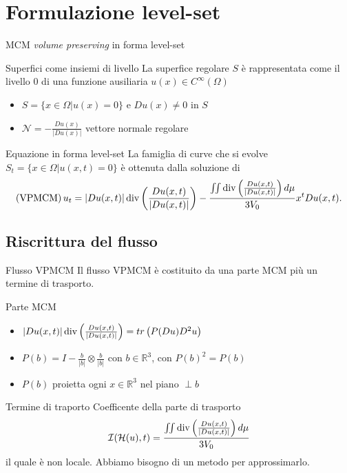 \section{Formulazione level-set}
\begin{frame}{MCM \emph{volume preserving} in forma level-set}
  \begin{block}{Superfici come insiemi di livello}
    La superfice regolare $S$ è rappresentata come il livello $0$ di
    una funzione ausiliaria $u(x)\in C^{\infty}(\Omega)$
    \begin{itemize}
      \item $S=\{x\in\Omega | u(x)=0\}$ e $Du(x)\neq 0$ in $S$
      \item $\mathcal{N}=-\frac{Du(x)}{|Du(x)|}$ vettore normale
        regolare
    \end{itemize}
  \end{block}
  \begin{block}{Equazione in forma level-set}
    La famiglia di curve che si evolve $S_t=\{x\in\Omega | u(x,t)=0\}$
    è ottenuta dalla soluzione di
    \[
      (\text{VPMCM})\,u_t=|Du(x,t)|\operatorname{div}\left(\frac{Du(x,t)}{|Du(x,t)|}\right)-\frac{\iint\operatorname{div}\left(\frac{Du(x,t)}{|Du(x,t)|}\right)d\mu}{3V_0}x^tDu(x,t). 
      \]
  \end{block}
\end{frame}
\subsection*{Riscrittura del flusso}
\begin{frame}{Flusso VPMCM}
  Il flusso VPMCM è costituito da una parte MCM più un termine di trasporto.
  \begin{block}{Parte MCM} 
    \begin{itemize}
    \item
      $|Du(x,t)|\operatorname{div}\left(\frac{Du(x,t)}{|Du(x,t)|}\right)=tr\left(P(Du)D^2u\right)$
    \item $P(b)=I-\frac{b}{|b|}\otimes\frac{b}{|b|}$ con
      $b\in\mathbb{R}^3$, con $P(b)^2=P(b)$
    \item $P(b)$ proietta ogni $x\in\mathbb{R}^3$ nel piano $\perp b$
    \end{itemize}
  \end{block}
  \begin{block}{Termine di traporto}
     Coefficente della parte di trasporto
    \[
    \mathcal{I}(\mathcal{H}(u),t)=\frac{\iint\operatorname{div}\left(\frac{Du(x,t)}{|Du(x,t)|}\right)d\mu}{3V_0}
    \] 
    il quale è non locale. Abbiamo bisogno di un metodo per
    approssimarlo.
  \end{block}
\end{frame}


